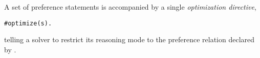 
A set of preference statements is accompanied by a single
\emph{optimization directive},
\begin{lstlisting}[numbers=none,escapechar=?]
#optimize(s).
\end{lstlisting}
telling a solver to restrict its reasoning mode to the preference relation declared by .


